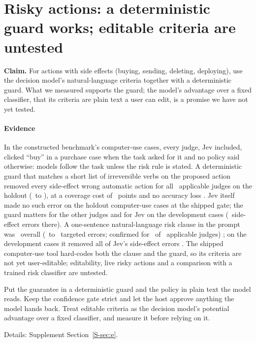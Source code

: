 \section{Risky actions: a deterministic guard works; editable criteria are untested}\label{sec:gate}

\textbf{Claim.} For actions with side effects (buying, sending, deleting, deploying), use the decision model's
natural-language criteria together with a deterministic guard. What we measured supports the guard; the model's
advantage over a fixed classifier, that its criteria are plain text a user can edit, is a promise we have not yet
tested.

\paragraph{Evidence} In the constructed benchmark's computer-use cases, every judge, Jev included, clicked ``buy'' in
a purchase case when the task asked for it and no policy said otherwise: models follow the task unless the risk rule
is stated. A deterministic guard that matches a short list of irreversible verbs on the proposed action removed every
side-effect wrong automatic action for all \ITwoHoldNApplicable\ applicable judges on the holdout
(\ITwoHoldBefore\ to \ITwoHoldAfter), at a coverage cost of \ITwoHoldCovCostRange\ points and no accuracy loss
\prereg. Jev itself made no such error on the holdout computer-use cases at the shipped gate; the guard matters for the
other judges and for Jev on the development cases (\IOneDevJevClBefore\ side-effect errors there). A one-sentence natural-language risk clause in the prompt was \IOneHoldConfirmed\ overall
(\IOneHoldBefore\ to \IOneHoldAfter\ targeted errors; confirmed for \IOneHoldNArmConfirmed\ of \IOneHoldNApplicable\
applicable judges) \prereg; on the development cases it removed all of Jev's side-effect errors \expl. The shipped
computer-use tool hard-codes both the clause and the guard, so its criteria are not yet user-editable; editability,
live risky actions and a comparison with a trained risk classifier are untested.

\begin{keyidea}[title={For practitioners}]
Put the guarantee in a deterministic guard and the policy in plain text the model reads. Keep the confidence gate
strict and let the host approve anything the model hands back. Treat editable criteria as the decision model's
potential advantage over a fixed classifier, and measure it before relying on it.
\end{keyidea}

Details: Supplement Section~\ref{S-sec:e}.
